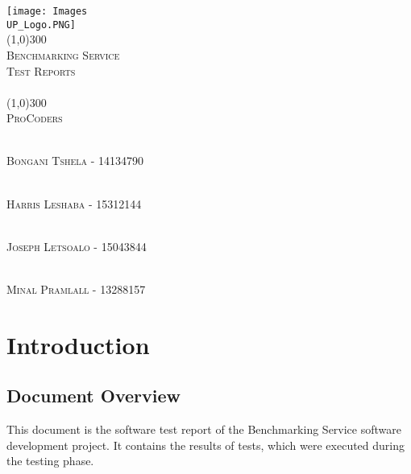 \documentclass[runningheads,a4paper]{article}
\begin{document}
	
\begin{titlepage}
	\begin{center}
		\texttt{[image: Images\\UP\_Logo.PNG]}  \\
		[1cm]
		\line(1,0){300} \\
		[0.3cm]
		\textsc{\Large
			Benchmarking Service\\
			Test Reports\\
			\hfill
		}\\
		[0.1cm]
		\line(1,0){300} \\
		[0.7cm]
		\textsc{\Large
			ProCoders
		} \\
	\end{center}
	
	\begin{center}
		\begin{centre}
			\textsc{\large\\
				Bongani Tshela - 14134790\\ 
			}
		
			\textsc{\large\\
				Harris Leshaba - 15312144\\ 
			}

			\textsc{\large\\
				Joseph Letsoalo - 15043844\\ 
			}
			
			\textsc{\large\\
				Minal Pramlall - 13288157\\ 
			}
			
		

            

		\end{centre}
		
		
		
	\end{center}
\end{titlepage}

\begingroup

\tableofcontents
{}
\endgroup
\newpage

\section{Introduction}
	\subsection{Document Overview}
		This document is the software test report of the Benchmarking Service software development project. It contains the results of tests, which were executed during the testing phase.
\end{document}
